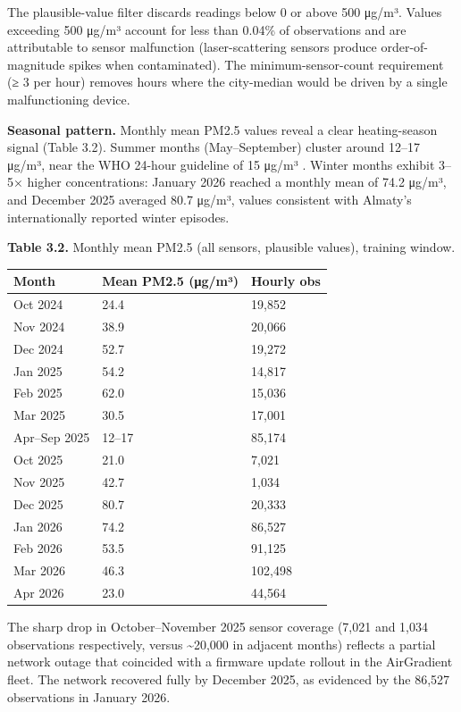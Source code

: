 The plausible-value filter discards readings below 0 or above 500 μg/m³. Values exceeding 500 μg/m³ account for less than 0.04\% of observations and are attributable to sensor malfunction (laser-scattering sensors produce order-of-magnitude spikes when contaminated). The minimum-sensor-count requirement (≥ 3 per hour) removes hours where the city-median would be driven by a single malfunctioning device.

\textbf{Seasonal pattern.} Monthly mean PM2.5 values reveal a clear heating-season signal (Table 3.2). Summer months (May--September) cluster around 12--17 μg/m³, near the WHO 24-hour guideline of 15 μg/m³ \cite{who_aqg_2021}. Winter months exhibit 3--5× higher concentrations: January 2026 reached a monthly mean of 74.2 μg/m³, and December 2025 averaged 80.7 μg/m³, values consistent with Almaty's internationally reported winter episodes.

\textbf{Table 3.2.} Monthly mean PM2.5 (all sensors, plausible values), training window.

\begin{longtable}[]{@{}lll@{}}
\toprule\noalign{}
Month & Mean PM2.5 (μg/m³) & Hourly obs \\
\midrule\noalign{}
\endhead
\bottomrule\noalign{}
\endlastfoot
Oct 2024 & 24.4 & 19,852 \\
Nov 2024 & 38.9 & 20,066 \\
Dec 2024 & 52.7 & 19,272 \\
Jan 2025 & 54.2 & 14,817 \\
Feb 2025 & 62.0 & 15,036 \\
Mar 2025 & 30.5 & 17,001 \\
Apr--Sep 2025 & 12--17 & 85,174 \\
Oct 2025 & 21.0 & 7,021 \\
Nov 2025 & 42.7 & 1,034 \\
Dec 2025 & 80.7 & 20,333 \\
Jan 2026 & 74.2 & 86,527 \\
Feb 2026 & 53.5 & 91,125 \\
Mar 2026 & 46.3 & 102,498 \\
Apr 2026 & 23.0 & 44,564 \\
\end{longtable}


The sharp drop in October--November 2025 sensor coverage (7,021 and 1,034 observations respectively, versus \textasciitilde20,000 in adjacent months) reflects a partial network outage that coincided with a firmware update rollout in the AirGradient fleet. The network recovered fully by December 2025, as evidenced by the 86,527 observations in January 2026.

